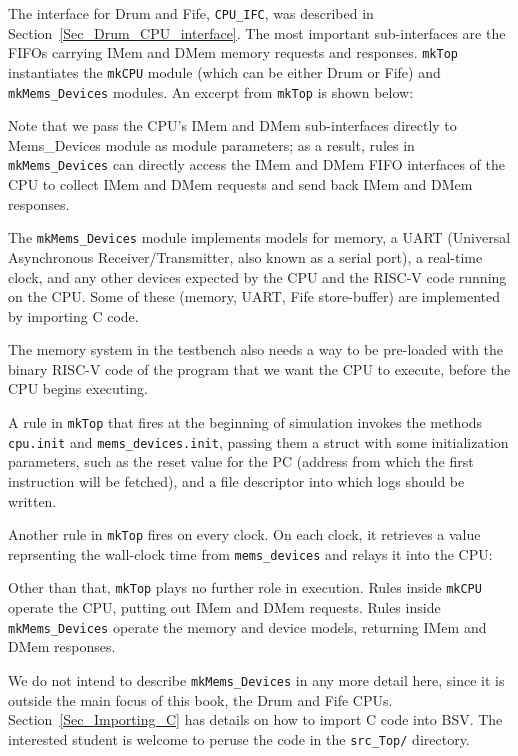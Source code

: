 The interface for Drum and Fife, \verb|CPU_IFC|, was described in
Section~\ref{Sec_Drum_CPU_interface}.  The most important
sub-interfaces are the FIFOs carrying IMem and DMem memory requests
and responses.  \verb|mkTop| instantiates the \verb|mkCPU| module
(which can be either Drum or Fife) and \verb|mkMems_Devices| modules.
An excerpt from \verb|mkTop| is shown below:



Note that we pass the CPU's IMem and DMem sub-interfaces directly to
Mems\_Devices module as module parameters; as a result, rules in
\verb|mkMems_Devices| can directly access the IMem and DMem FIFO
interfaces of the CPU to collect IMem and DMem requests and send back
IMem and DMem responses.

The \verb|mkMems_Devices| module implements models for memory, a UART
(Universal Asynchronous Receiver/Transmitter, also known as a serial
port), a real-time clock, and any other devices expected by the CPU
and the RISC-V code running on the CPU.  Some of these (memory, UART,
Fife store-buffer) are implemented by importing C code.

The memory system in the testbench also needs a way to be pre-loaded
with the binary RISC-V code of the program that we want the CPU to
execute, before the CPU begins executing.

A rule in \verb|mkTop| that fires at the beginning of simulation
invokes the methods \verb|cpu.init| and \verb|mems_devices.init|,
passing them a struct with some initialization parameters, such as the
reset value for the PC (address from which the first instruction will
be fetched), and a file descriptor into which logs should be written.



Another rule in \verb|mkTop| fires on every clock.  On each clock, it
retrieves a value reprsenting the wall-clock time from
\verb|mems_devices| and relays it into the CPU:



Other than that, \verb|mkTop| plays no further role in execution.
Rules inside \verb|mkCPU| operate the CPU, putting out IMem and DMem
requests.  Rules inside \verb|mkMems_Devices| operate the memory and
device models, returning IMem and DMem responses.

We do not intend to describe \verb|mkMems_Devices| in any more detail
here, since it is outside the main focus of this book, the Drum and
Fife CPUs.  Section~\ref{Sec_Importing_C} has details on how to import
C code into BSV.  The interested student is welcome to peruse the code
in the \verb|src_Top/| directory.

